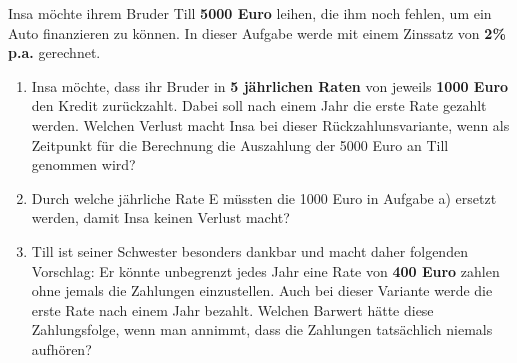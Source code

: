 \begin{Aufgabe}[8] 
Insa möchte ihrem Bruder Till \textbf{5000 Euro} leihen, die ihm noch fehlen, um ein Auto finanzieren zu können. In dieser Aufgabe werde mit einem Zinssatz von \textbf{2\% p.a.} gerechnet.
\begin{enumerate}
	\item 
	Insa möchte, dass ihr Bruder in \textbf{5 jährlichen Raten} von jeweils \textbf{1000 Euro} den Kredit zurückzahlt. Dabei soll nach einem Jahr die erste Rate gezahlt werden.
	Welchen Verlust macht Insa bei dieser Rückzahlunsvariante, wenn als Zeitpunkt für die Berechnung die Auszahlung der 5000 Euro an Till genommen wird?
	\item 
	Durch welche jährliche Rate E müssten die 1000 Euro in Aufgabe a) ersetzt werden, damit Insa keinen Verlust macht?
	\item
	Till ist seiner Schwester besonders dankbar und macht daher folgenden Vorschlag: Er könnte unbegrenzt jedes Jahr eine Rate von \textbf{400 Euro} zahlen ohne jemals die Zahlungen einzustellen. Auch bei dieser Variante werde die erste Rate nach einem Jahr bezahlt. Welchen Barwert hätte diese Zahlungsfolge, wenn man annimmt, dass die Zahlungen tatsächlich niemals aufhören? 
	
\end{enumerate}

 \ifLoesung
\else
\newpage
\Loesung{}{}
\fi

\end{Aufgabe}

\newpage


\endinput
